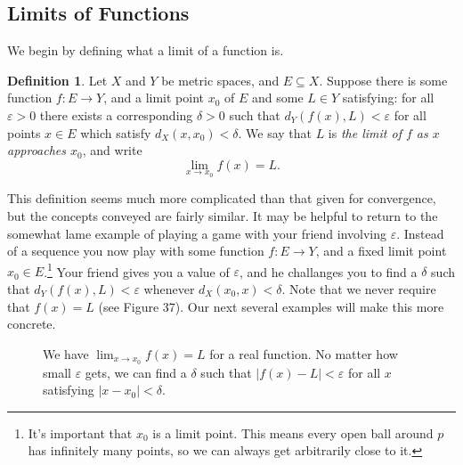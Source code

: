 \documentclass{article}
\newcommand{\R}{\mathbb{R}}
\theoremstyle{definition}
\newtheorem{definition}{Definition}[section]
\begin{document}
	\subsection{Limits of Functions}
	We begin by defining what a limit of a function is.
	\begin{definition}\label{def4.1}
		Let $ X $ and $ Y $ be metric spaces, and $ E\subseteq X $. Suppose there is some function $ f:E\to Y $, and a limit point $ x_0 $ of $ E $ and some $ L\in Y $ satisfying: for all $ \varepsilon>0 $ there exists a corresponding $ \delta>0 $ such that $d_Y(f(x),L)<\varepsilon $ for all points $ x\in E $ which satisfy $ d_X(x,x_0)<\delta $. We say that $ L $ is \textit{\color{red}the limit of $ f $ as $ x $ approaches $x_0$}, and write $$\lim\limits_{x\to x_0}f(x)=L .$$
	\end{definition} 
	This definition seems much more complicated than that given for convergence, but the concepts conveyed are fairly similar. It may be helpful to return to the somewhat lame example of playing a game with your friend involving $ \varepsilon $. Instead of a sequence you now play with some function $ f:E\to Y $, and a fixed limit point $ x_0\in E $.\footnote{It's important that $x_0$ is a limit point. This means every open ball around $ p $ has infinitely many points, so we can always get arbitrarily close to it.} Your friend gives you a value of $ \varepsilon $, and he challanges you to find a $ \delta $ such that $ d_Y(f(x),L)<\varepsilon $ whenever $ d_X(x_0,x)<\delta $. Note that we never require that $ f(x)=L $ (see Figure 37). Our next several examples will make this more concrete.
	\begin{figure}[h!]
		\centering
		\caption{We have $ \lim_{x\to x_0}f(x)=L $ for a real function. No matter how small $\varepsilon $ gets, we can find a $ \delta $ such that $ |f(x)-L|<\varepsilon $ for all $ x $ satisfying $ |x-x_0|<\delta $. }
	\end{figure}
\end{document}

